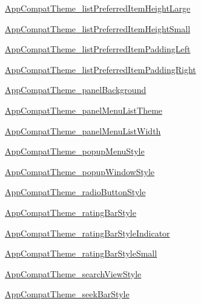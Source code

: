\begin{Desc}
\hyperlink{classandroid_1_1support_1_1v4_1_1_r_1_1styleable_8e939e05300583b0aef1b0e9e345f506}{AppCompatTheme\_\-listPreferredItemHeightLarge} 

\hyperlink{classandroid_1_1support_1_1v4_1_1_r_1_1styleable_fee8f8be3df435711c5bb0d3b5eb1bdd}{AppCompatTheme\_\-listPreferredItemHeightSmall} 

\hyperlink{classandroid_1_1support_1_1v4_1_1_r_1_1styleable_9cce233669ccd45e691fcd5ebd0a293a}{AppCompatTheme\_\-listPreferredItemPaddingLeft} 

\hyperlink{classandroid_1_1support_1_1v4_1_1_r_1_1styleable_265ab9cd877ed88fe04ba61fc41703e3}{AppCompatTheme\_\-listPreferredItemPaddingRight} 

\hyperlink{classandroid_1_1support_1_1v4_1_1_r_1_1styleable_1423cc9159dec9dd298b6391ef1df328}{AppCompatTheme\_\-panelBackground} 

\hyperlink{classandroid_1_1support_1_1v4_1_1_r_1_1styleable_8e2495f71c94aa2c96f2965980b2f309}{AppCompatTheme\_\-panelMenuListTheme} 

\hyperlink{classandroid_1_1support_1_1v4_1_1_r_1_1styleable_5eae8eccd5625c8acb9a2d0522e7fd35}{AppCompatTheme\_\-panelMenuListWidth} 

\hyperlink{classandroid_1_1support_1_1v4_1_1_r_1_1styleable_833514c9937294d571844e13b7a70786}{AppCompatTheme\_\-popupMenuStyle} 

\hyperlink{classandroid_1_1support_1_1v4_1_1_r_1_1styleable_7b4761ddad1866b99166d9027b1a91de}{AppCompatTheme\_\-popupWindowStyle} 

\hyperlink{classandroid_1_1support_1_1v4_1_1_r_1_1styleable_530d6e3b48153addedc781558453a828}{AppCompatTheme\_\-radioButtonStyle} 

\hyperlink{classandroid_1_1support_1_1v4_1_1_r_1_1styleable_03df554f42548e6c63fa0608aaba9647}{AppCompatTheme\_\-ratingBarStyle} 

\hyperlink{classandroid_1_1support_1_1v4_1_1_r_1_1styleable_8ba7f811197cd79ba92bd8c7919d4936}{AppCompatTheme\_\-ratingBarStyleIndicator} 

\hyperlink{classandroid_1_1support_1_1v4_1_1_r_1_1styleable_267c7cd6a0c6a2c317ac9a33722b06eb}{AppCompatTheme\_\-ratingBarStyleSmall} 

\hyperlink{classandroid_1_1support_1_1v4_1_1_r_1_1styleable_4c487a848b41d29bf3dc21719d968cd6}{AppCompatTheme\_\-searchViewStyle} 

\hyperlink{classandroid_1_1support_1_1v4_1_1_r_1_1styleable_feb452e918c5ee9d2dc74ac8a5370e9d}{AppCompatTheme\_\-seekBarStyle} 


\end{Desc}
